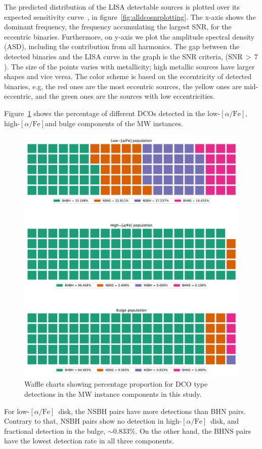 \documentclass[journal, twocolumn]{IEEEtran}
\newcommand{\lowalpha}{low-$[\alpha/\text{Fe}]$}
\newcommand{\highalpha}{high-$[\alpha/\text{Fe}]$}
\begin{document}
    The predicted distribution of the LISA detectable sources is plotted over its expected sensitivity curve~\cite{Robson2019}, in figure~\ref{fig:alldcosnrplotting}.
    The x-axis shows the dominant frequency, the frequency accumulating the largest SNR, for the eccentric binaries.
    Furthermore, on y-axis we plot the amplitude spectral density (ASD), including the contribution from all harmonics.
    The gap between the detected binaries and the LISA curve in the graph is the SNR criteria, ($\text{SNR}\,>\,7$).
    The size of the points varies with metallicity; high metallic sources have larger shapes and vice versa.
    The color scheme is based on the eccentricity of detected binaries, e.g, the red ones are the most eccentric sources, the yellow ones are mid-eccentric, and the green ones are the sources with low eccentricities.

    Figure~\ref{fig:dcotypemwcomponentdistributioncropped} shows the percentage of different DCOs detected in the \lowalpha, \highalpha and bulge components of the MW instances.

    \begin{figure}[!h]%
        \centering
        \includegraphics[width=\columnwidth]{analysis_data/main_analysis_folder/dco_type_MW_component_distribution_cropped}
        \caption{Waffle charts showing percentage proportion for DCO type detections in the MW instance components in this study.}
        \label{fig:dcotypemwcomponentdistributioncropped}
    \end{figure}%
    For \lowalpha\ disk, the NSBH pairs have more detections than BHN pairs.
    Contrary to that, NSBH pairs show no detection in \highalpha\ disk, and fractional detection in the bulge, $\sim0.833\%$.
    On the other hand, the BHNS pairs have the lowest detection rate in all three components.
\end{document}
